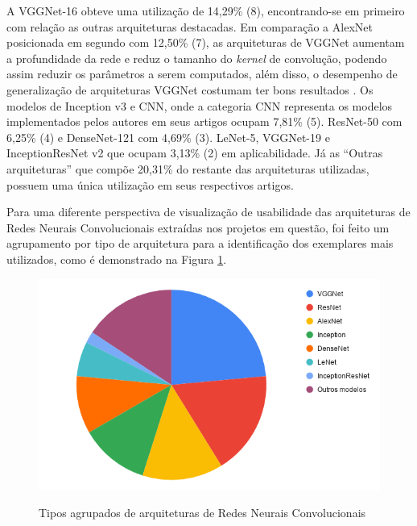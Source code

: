 \documentclass[
	12pt,				%
	oneside,			%
	a4paper,			%
	english,			%
	brazil				%
	]{abntex2ppgsi}
\begin{document}
A VGGNet-16 obteve uma utilização de 14,29\% (8), encontrando-se em primeiro com relação as outras arquiteturas destacadas. Em comparação a AlexNet posicionada em segundo com 12,50\% (7), as arquiteturas de VGGNet aumentam a profundidade da rede e reduz o tamanho do \textit{kernel} de convolução, podendo assim reduzir os parâmetros a serem computados, além disso, o desempenho de generalização de arquiteturas VGGNet costumam ter bons resultados \cite{li2020using}. Os modelos de Inception v3 e CNN, onde a categoria CNN representa os modelos implementados pelos autores em seus artigos ocupam 7,81\% (5). ResNet-50 com 6,25\% (4) e DenseNet-121 com 4,69\% (3). LeNet-5, VGGNet-19 e InceptionResNet v2 que ocupam 3,13\% (2) em aplicabilidade. Já as ``Outras arquiteturas'' que compõe 20,31\% do restante das arquiteturas utilizadas, possuem uma única utilização em seus respectivos artigos.

Para uma diferente perspectiva de visualização de usabilidade das arquiteturas de Redes Neurais Convolucionais extraídas nos projetos em questão, foi feito um agrupamento por tipo de arquitetura para a identificação dos exemplares mais utilizados, como é demonstrado na Figura \ref{fig:grafico_arquitetura_agrupada_vs_uso}.

\begin{figure}[H]
    \centering
    \caption{Tipos agrupados de arquiteturas de Redes Neurais Convolucionais}
    \includegraphics[scale=.60]{imagens/grafico_arquitetura_agrupada_vs_uso.png}
    \label{fig:grafico_arquitetura_agrupada_vs_uso}
\end{figure}
\end{document}
